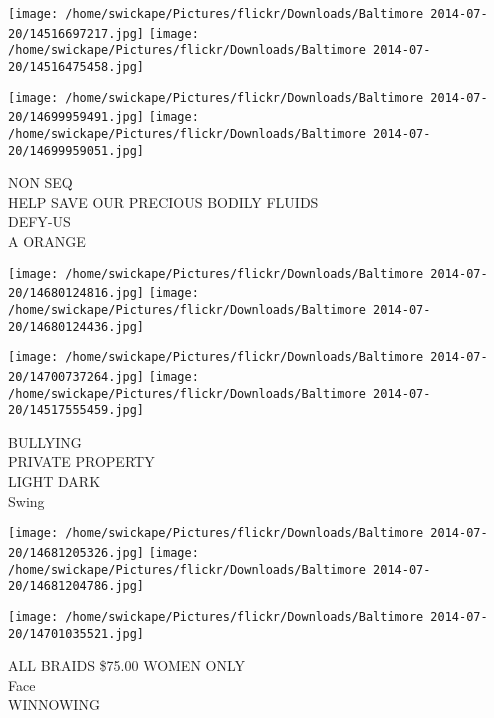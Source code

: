\documentclass[10pt,letterpaper]{article}
\begin{document}
\texttt{[image: /home/swickape/Pictures/flickr/Downloads/Baltimore 2014-07-20/14516697217.jpg]}
\texttt{[image: /home/swickape/Pictures/flickr/Downloads/Baltimore 2014-07-20/14516475458.jpg]}

\texttt{[image: /home/swickape/Pictures/flickr/Downloads/Baltimore 2014-07-20/14699959491.jpg]}
\texttt{[image: /home/swickape/Pictures/flickr/Downloads/Baltimore 2014-07-20/14699959051.jpg]}

NON SEQ\\
HELP SAVE OUR PRECIOUS BODILY FLUIDS\\
DEFY{-}US\\
A ORANGE\\
\pagebreak

\texttt{[image: /home/swickape/Pictures/flickr/Downloads/Baltimore 2014-07-20/14680124816.jpg]}
\texttt{[image: /home/swickape/Pictures/flickr/Downloads/Baltimore 2014-07-20/14680124436.jpg]}

\texttt{[image: /home/swickape/Pictures/flickr/Downloads/Baltimore 2014-07-20/14700737264.jpg]}
\texttt{[image: /home/swickape/Pictures/flickr/Downloads/Baltimore 2014-07-20/14517555459.jpg]}

BULLYING\\
PRIVATE PROPERTY\\
LIGHT DARK\\
Swing\\
\pagebreak

\texttt{[image: /home/swickape/Pictures/flickr/Downloads/Baltimore 2014-07-20/14681205326.jpg]}
\texttt{[image: /home/swickape/Pictures/flickr/Downloads/Baltimore 2014-07-20/14681204786.jpg]}

\texttt{[image: /home/swickape/Pictures/flickr/Downloads/Baltimore 2014-07-20/14701035521.jpg]}

ALL BRAIDS \$75.00 WOMEN ONLY\\
Face\\
WINNOWING\\
\pagebreak
\end{document}
